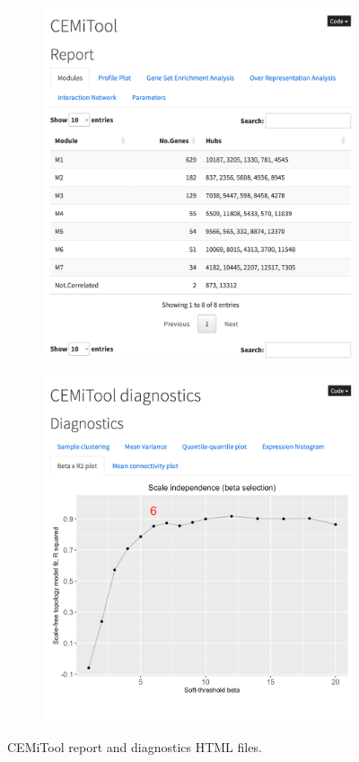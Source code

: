 \begin{figure}[!htb]

  \begin{subfigure}{0.5\textwidth}
    \includegraphics[width=0.9\linewidth]{images/cemi-report} 
  \end{subfigure}
  \begin{subfigure}{0.5\textwidth}
    \includegraphics[width=0.9\linewidth]{images/cemi-diagnostics}
  \end{subfigure}

\caption{CEMiTool report and diagnostics HTML files.}
\label{fig:cemi-htmls}
\end{figure}



